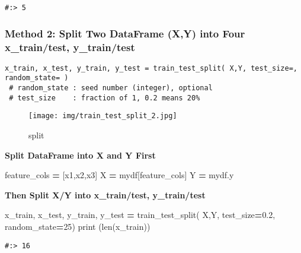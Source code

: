 \documentclass[
]{book}
\newenvironment{Shaded}{\begin{snugshade}}{\end{snugshade}}
\newcommand{\BuiltInTok}[1]{#1}
\newcommand{\DecValTok}[1]{\textcolor[rgb]{0.06,0.06,0.06}{#1}}
\newcommand{\FloatTok}[1]{\textcolor[rgb]{0.06,0.06,0.06}{#1}}
\newcommand{\NormalTok}[1]{#1}
\newcommand{\OperatorTok}[1]{\textcolor[rgb]{0.43,0.43,0.43}{\textbf{#1}}}
\newcommand{\StringTok}[1]{\textcolor[rgb]{0.5,0.5,0.5}{#1}}
\begin{document}
\begin{verbatim}
#:> 5
\end{verbatim}

\hypertarget{method-2-split-two-dataframe-xy-into-four-x_traintest-y_traintest}{%
\subsubsection{Method 2: Split Two DataFrame (X,Y) into Four x\_train/test, y\_train/test}\label{method-2-split-two-dataframe-xy-into-four-x_traintest-y_traintest}}

\begin{verbatim}
x_train, x_test, y_train, y_test = train_test_split( X,Y, test_size=, random_state= )
 # random_state : seed number (integer), optional
 # test_size    : fraction of 1, 0.2 means 20%
\end{verbatim}

\begin{figure}
\centering
\texttt{[image: img/train\_test\_split\_2.jpg]}
\caption{split}
\end{figure}

\textbf{Split DataFrame into X and Y First}

\begin{Shaded}
\begin{Highlighting}[]
\NormalTok{feature\_cols }\OperatorTok{=}\NormalTok{ [}\StringTok{\textquotesingle{}x1\textquotesingle{}}\NormalTok{,}\StringTok{\textquotesingle{}x2\textquotesingle{}}\NormalTok{,}\StringTok{\textquotesingle{}x3\textquotesingle{}}\NormalTok{]}
\NormalTok{X }\OperatorTok{=}\NormalTok{ mydf[feature\_cols]}
\NormalTok{Y }\OperatorTok{=}\NormalTok{ mydf.y}
\end{Highlighting}
\end{Shaded}

\textbf{Then Split X/Y into x\_train/test, y\_train/test}

\begin{Shaded}
\begin{Highlighting}[]
\NormalTok{x\_train, x\_test, y\_train, y\_test }\OperatorTok{=}\NormalTok{ train\_test\_split( X,Y, test\_size}\OperatorTok{=}\FloatTok{0.2}\NormalTok{, random\_state}\OperatorTok{=}\DecValTok{25}\NormalTok{)}
\BuiltInTok{print}\NormalTok{ (}\BuiltInTok{len}\NormalTok{(x\_train))}
\end{Highlighting}
\end{Shaded}

\begin{verbatim}
#:> 16
\end{verbatim}
\end{document}
